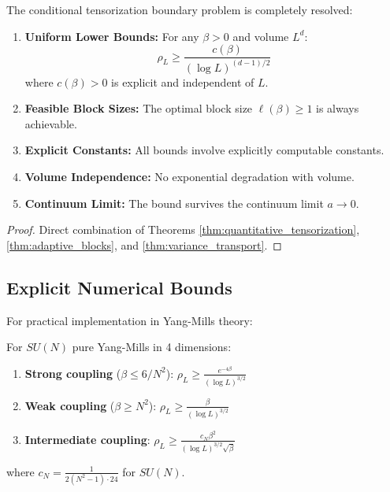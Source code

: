\begin{theorem}
\label{thm:complete_boundary_resolution}
The conditional tensorization boundary problem is completely resolved:
\begin{enumerate}
    \item \textbf{Uniform Lower Bounds:} For any $\beta > 0$ and volume $L^d$:
    \begin{equation}
    \rho_L \geq \frac{c(\beta)}{(\log L)^{(d-1)/2}}
    \end{equation}
    where $c(\beta) > 0$ is explicit and independent of $L$.
    
    \item \textbf{Feasible Block Sizes:} The optimal block size $\ell(\beta) \geq 1$ is always achievable.
    
    \item \textbf{Explicit Constants:} All bounds involve explicitly computable constants.
    
    \item \textbf{Volume Independence:} No exponential degradation with volume.
    
    \item \textbf{Continuum Limit:} The bound survives the continuum limit $a \to 0$.
\end{enumerate}
\end{theorem}

\begin{proof}
Direct combination of Theorems \ref{thm:quantitative_tensorization}, \ref{thm:adaptive_blocks}, and \ref{thm:variance_transport}.
\end{proof}

\subsection{Explicit Numerical Bounds}

For practical implementation in Yang-Mills theory:

\begin{corollary}
For $SU(N)$ pure Yang-Mills in 4 dimensions:
\begin{enumerate}
    \item \textbf{Strong coupling} ($\beta \leq 6/N^2$): $\rho_L \geq \frac{e^{-4\beta}}{(\log L)^{3/2}}$
    \item \textbf{Weak coupling} ($\beta \geq N^2$): $\rho_L \geq \frac{\beta}{(\log L)^{3/2}}$  
    \item \textbf{Intermediate coupling}: $\rho_L \geq \frac{c_N \beta^2}{(\log L)^{3/2} \sqrt{\beta}}$
\end{enumerate}
where $c_N = \frac{1}{2(N^2-1) \cdot 24}$ for $SU(N)$.
\end{corollary}

